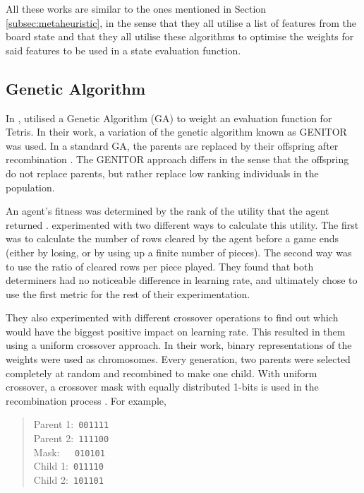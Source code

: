 \documentclass[a4paper, 12pt]{extreport}
\begin{document}
	All these works are similar to the ones mentioned in Section \ref{subsec:metaheuristic}, in the sense that they all utilise a list of features from the board state and that they all utilise these algorithms to optimise the weights for said features to be used in a state evaluation function.
	
	\subsection{Genetic Algorithm}
	
	In \citeyear{tetris-ga-flom-robinson}, \citeauthor{tetris-ga-flom-robinson} \cite{tetris-ga-flom-robinson} utilised a Genetic Algorithm (GA) to weight an evaluation function for Tetris. In their work, a variation of the genetic algorithm known as GENITOR was used. In a standard GA, the parents are replaced by their offspring after recombination \cite{genitor}. The GENITOR approach differs in the sense that the offspring do not replace parents, but rather replace low ranking individuals in the population.
	
	An agent's fitness was determined by the rank of the utility that the agent returned \cite{tetris-ga-flom-robinson}. \citeauthor{tetris-ga-flom-robinson} experimented with two different ways to calculate this utility. The first was to calculate the number of rows cleared by the agent before a game ends (either by losing, or by using up a finite number of pieces). The second way was to use the ratio of cleared rows per piece played. They found that both determiners had no noticeable difference in learning rate, and ultimately chose to use the first metric for the rest of their experimentation.
	
	They also experimented with different crossover operations to find out which would have the biggest positive impact on learning rate. This resulted in them using a uniform crossover approach. In their work, binary representations of the weights were used as chromosomes. Every generation, two parents were selected completely at random and recombined to make one child. With uniform crossover, a crossover mask with equally distributed 1-bits is used in the recombination process \cite{uniform-crossover}. For example,
	
	\begin{quote}
		Parent 1:\verb| 001111|\\
		Parent 2:\verb| 111100|\\
		Mask:\hspace{4pt}\verb|   010101|\\
		Child 1:\hspace{6pt}\verb| 011110|\\
		Child 2:\hspace{6pt}\verb| 101101|
	\end{quote}
	
\end{document}
